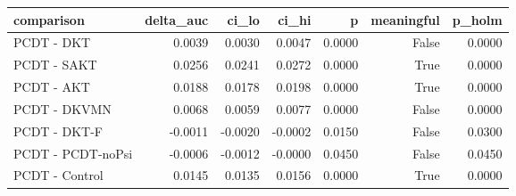 \begin{tabular}{lrrrrrr}
\toprule
comparison & delta\_auc & ci\_lo & ci\_hi & p & meaningful & p\_holm \\
\midrule
PCDT - DKT & 0.0039 & 0.0030 & 0.0047 & 0.0000 & False & 0.0000 \\
PCDT - SAKT & 0.0256 & 0.0241 & 0.0272 & 0.0000 & True & 0.0000 \\
PCDT - AKT & 0.0188 & 0.0178 & 0.0198 & 0.0000 & True & 0.0000 \\
PCDT - DKVMN & 0.0068 & 0.0059 & 0.0077 & 0.0000 & False & 0.0000 \\
PCDT - DKT-F & -0.0011 & -0.0020 & -0.0002 & 0.0150 & False & 0.0300 \\
PCDT - PCDT-noPsi & -0.0006 & -0.0012 & -0.0000 & 0.0450 & False & 0.0450 \\
PCDT - Control & 0.0145 & 0.0135 & 0.0156 & 0.0000 & True & 0.0000 \\
\bottomrule
\end{tabular}
